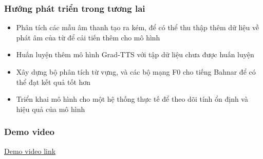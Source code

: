 \documentclass{beamer}
\numberwithin{figure}{section}
\numberwithin{table}{section}
\begin{document}
\begin{frame}
\frametitle{Hướng phát triển trong tương lai}
\begin{itemize}
    \item[--] Phân tích các mẫu âm thanh tạo ra kém, để có thể thu thập thêm dữ liệu về phát âm của từ để cải tiến thêm cho mô hình
    \item[--] Huấn luyện thêm mô hình Grad-TTS với tập dữ liệu chưa được huấn luyện
    \item[--] Xây dựng bộ phân tích từ vựng, và các bộ mạng F0 cho tiếng Bahnar để có thể đạt kết quả tốt hơn
    \item[--] Triển khai mô hình cho một hệ thống thực tế để theo dõi tính ổn định và hiệu quả của mô hình
\end{itemize}

\end{frame}

\begin{frame}
\frametitle{Demo video}
\begin{center}
    \href{https://youtu.be/ZkYbxshOVbU}{Demo video link}
\end{center}


\end{frame}




\end{document}
